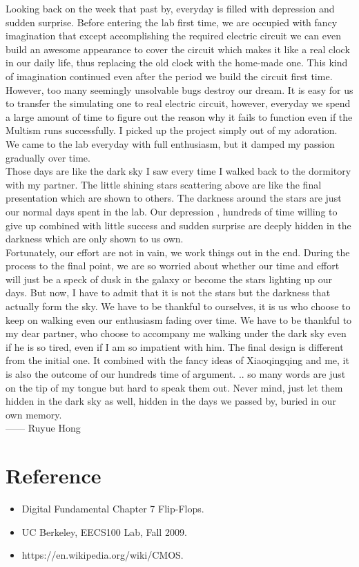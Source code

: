 \documentclass[12pt]{article}
\begin{document}
Looking back on the week that past by, everyday is filled with depression and sudden surprise. Before entering the lab first time, we are occupied with fancy imagination that except accomplishing the required electric circuit we can even build an awesome appearance to cover the circuit which makes it like a real clock in our daily life, thus replacing the old clock with the home-made one. This kind of imagination continued even after the period we build the circuit first time. However, too many seemingly unsolvable bugs destroy our dream. It is easy for us to transfer the simulating one to real electric circuit, however, everyday we spend a large amount of time to figure out the reason why it fails to function even if the Multism runs successfully. I picked up the project simply out of my adoration. We came to the lab everyday with full enthusiasm, but it damped my passion gradually over time. \\
	Those days are like the dark sky I saw every time I walked back to the dormitory with my partner. The little shining stars scattering above are like the final presentation which are shown to others. The darkness around the stars are just our normal days spent in the lab. Our depression , hundreds of time willing to give up combined with little success and sudden surprise are deeply hidden in the darkness which are only shown to us own. \\
	Fortunately, our effort are not in vain, we work things out in the end. During the process to the final point, we are so worried about whether our time and effort will just be a speck of dusk in the galaxy or become the stars lighting up our days. But now, I have to admit that it is not the stars but the darkness that actually form the sky. We have to be thankful to ourselves, it is us who choose to keep on walking even our enthusiasm fading over time. We have to be thankful to my dear partner, who choose to accompany me walking under the dark sky even if he is so tired, even if I am so impatient with him. The final design is different from the initial one. It combined with the fancy ideas of Xiaoqingqing and me, it is also the outcome of our hundreds time of argument. .. so many words are just on the tip of my tongue but hard to speak them out. Never mind, just let them hidden in the dark sky as well, hidden in the days we passed by, buried in our own memory.\\
	—— Ruyue Hong\\

\section{Reference}
\begin{itemize}
\item Digital Fundamental Chapter 7 Flip-Flops.
\item UC Berkeley, EECS100 Lab, Fall 2009.
\item https://en.wikipedia.org/wiki/CMOS.
\end{itemize}
\end{document}

